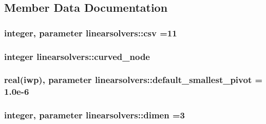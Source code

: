 \subsection{Member Data Documentation}
\hypertarget{classlinearsolvers_a49a55d932e7021639b2202650625c73d}{}
\subsubsection[{csv}]{\setlength{\rightskip}{0pt plus 5cm}integer, parameter linearsolvers\+::csv =11}\label{classlinearsolvers_a49a55d932e7021639b2202650625c73d}
\hypertarget{classlinearsolvers_ab6c5dcc0fd013301b8dba92399cf425e}{}
\subsubsection[{curved\+\_\+node}]{\setlength{\rightskip}{0pt plus 5cm}integer linearsolvers\+::curved\+\_\+node}\label{classlinearsolvers_ab6c5dcc0fd013301b8dba92399cf425e}
\hypertarget{classlinearsolvers_a1045ebc16c5962f7bfe6da3e58f1016b}{}
\subsubsection[{default\+\_\+smallest\+\_\+pivot}]{\setlength{\rightskip}{0pt plus 5cm}real({\bf iwp}), parameter linearsolvers\+::default\+\_\+smallest\+\_\+pivot = 1.\+0e-\/6}\label{classlinearsolvers_a1045ebc16c5962f7bfe6da3e58f1016b}
\hypertarget{classlinearsolvers_afc5c1c2544af5d4b0be295c5b9f3d524}{}
\subsubsection[{dimen}]{\setlength{\rightskip}{0pt plus 5cm}integer, parameter linearsolvers\+::dimen =3}\label{classlinearsolvers_afc5c1c2544af5d4b0be295c5b9f3d524}
\hypertarget{classlinearsolvers_aa8d800b0797e3fcb1f1b356e1f50c72f}{}
